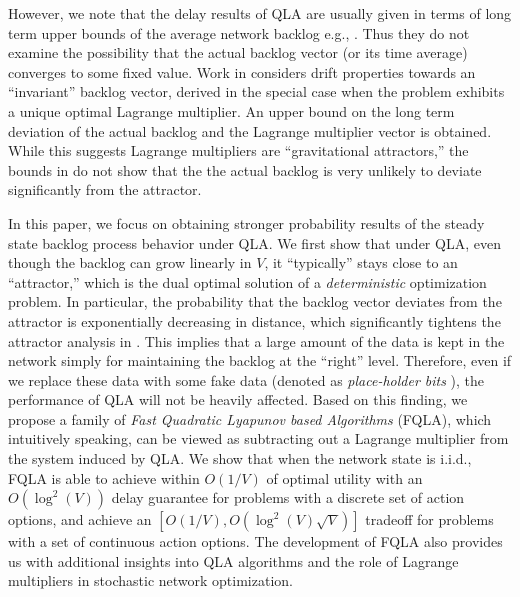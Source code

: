 \documentclass[journal]{IEEEtran}
\begin{document}

However, we note that the delay results of QLA are usually given in terms of long term upper bounds of the average network backlog e.g., \cite{neelynowbook}. Thus they do not examine the possibility that the actual backlog vector (or its time average) converges to some fixed value. Work in \cite{eryilmaz_qbsc_ton07} considers drift properties towards an ``invariant'' backlog vector, derived in the special case when the problem exhibits a unique optimal Lagrange multiplier. An upper bound on the long term deviation of the actual backlog and the Lagrange multiplier vector is obtained. While this suggests Lagrange multipliers are ``gravitational attractors,'' the bounds in \cite{eryilmaz_qbsc_ton07} do not show that the the actual backlog is very unlikely to deviate significantly from the attractor.

 

In this paper, we focus on obtaining stronger probability results of the steady state backlog process behavior under QLA. We first show that under QLA, even though the backlog can grow linearly in $V$, it ``typically'' stays close to an ``attractor,'' which is the dual optimal solution of a \emph{deterministic} optimization problem. In particular, the probability that the backlog vector deviates from the attractor is exponentially decreasing in distance, which significantly tightens the attractor analysis in \cite{eryilmaz_qbsc_ton07}. This implies that a large amount of the data is kept in the network simply for maintaining the backlog at the ``right'' level. Therefore, even if we replace these data with some fake data (denoted as \emph{place-holder bits} \cite{neelyrahul_asilomar}), the performance of QLA will not be heavily affected. 
Based on this finding, we propose a family of \emph{Fast Quadratic Lyapunov based Algorithms} (FQLA), which intuitively speaking, can be viewed as subtracting out a Lagrange multiplier from the system induced by QLA.  We show that when the network state is i.i.d., FQLA is able to achieve within  $O(1/V)$ of optimal utility with an $O(\log^2(V))$ delay guarantee for problems with a discrete set of action options, and achieve an $[O(1/V), O(\log^2(V)\sqrt{V})]$ tradeoff for problems with a set of continuous action options. 
The development of FQLA also provides us with additional  insights  into QLA algorithms and the role of Lagrange multipliers in stochastic network optimization. 
\end{document}
